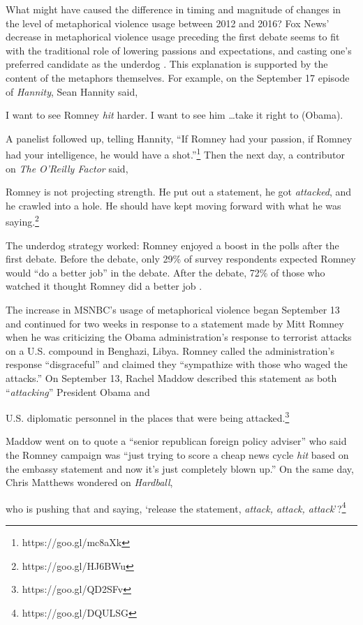What might have caused the difference in timing and magnitude of changes in
the level of metaphorical violence usage between 2012 and 2016? Fox News' 
decrease in metaphorical violence usage preceding the first debate seems to
fit with the traditional role of lowering passions and expectations, and 
casting one's preferred candidate as the underdog \cite{Schroeder2008}. 
This explanation is supported by the content of the metaphors themselves. For example, on
the September 17 episode of \emph{Hannity}, Sean Hannity said, 
\begin{exe}
  \ex I want to see Romney {\em hit} harder. I want to see him \ldots take it right to (Obama).
\end{exe}
A panelist followed up, telling Hannity, ``If Romney had your passion, if
Romney had your intelligence, he would have a shot.''\footnote{\tiny https://goo.gl/mc8aXk}
Then the next day, a contributor on \emph{The O'Reilly Factor} said,
\begin{exe}
  \ex Romney is not projecting strength. He put out a statement, he got {\em attacked}, 
   and he crawled into a hole. He should have kept moving forward with what he was saying.\footnote{\tiny https://goo.gl/HJ6BWu} 
\end{exe}
The underdog strategy worked: Romney enjoyed a boost in the polls
after the first debate. Before the debate, only 29\% of survey respondents
expected Romney would ``do a better job'' in the debate. After the debate,
72\% of those who watched it thought Romney did a better job \cite{Pew2012}.

The increase in MSNBC's usage of metaphorical violence began September
13 and continued for two weeks in response to a statement made
by Mitt Romney when he was criticizing the Obama administration's response to terrorist 
attacks on a U.S. compound in Benghazi, Libya. 
Romney called the administration's response ``disgraceful'' and 
claimed they ``sympathize with those who waged the attacks.''
On September 13, Rachel Maddow described this statement as both ``\emph{attacking}''
President Obama and 
\begin{exe}
   U.S. diplomatic personnel in the places that were
being attacked.\footnote{\tiny https://goo.gl/QD2SFv} 
\end{exe}
Maddow went on to quote a 
``senior republican foreign policy adviser'' who said the Romney campaign was
``just trying to score a cheap news cycle \emph{hit} based on the embassy statement
and now it's just completely blown up.'' On the same day, Chris Matthews
wondered on \emph{Hardball}, 
\begin{exe}
  \ex who is pushing that and saying, `release the
statement, \emph{attack, attack, attack}'?\footnote{\tiny https://goo.gl/DQULSG} 
\end{exe}

